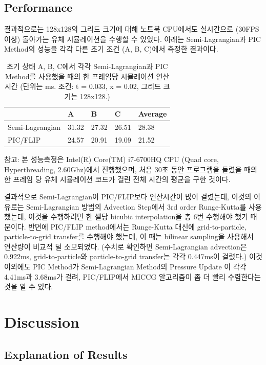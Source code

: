 \documentclass[10pt, A4]{article}
\begin{document}
\subsection{Performance}

결과적으로는 128x128의 그리드 크기에 대해 노트북 CPU에서도 실시간으로 (30FPS 이상) 돌아가는 유체 시뮬레이션을 수행할 수 있었다. 아래는 Semi-Lagrangian과 PIC Method의 성능을 각각 다른 초기 조건 (A, B, C)에서 측정한 결과이다. 

\begin{table}[h]
\centering
\begin{tabular}{|l|l|l|l|l|}
\hline
                & A     & B     & C     & Average \\ \hline
Semi-Lagrangian & 31.32 & 27.32 & 26.51 & 28.38   \\ \hline
PIC/FLIP        & 24.57 & 20.91 & 19.09 & 21.52   \\ \hline
\end{tabular}
  \caption{초기 상태 A, B, C에서 각각 Semi-Lagrangian과 PIC Method를 사용했을 때의 한 프레임당 시뮬레이션 연산 시간 (단위는 ms. 조건: \Delta t = 0.033, \Delta x = 0.02, 그리드 크기는 128x128.)}
\end{table}

참고: 본 성능측정은 Intel(R) Core(TM) i7-6700HQ CPU (Quad core, Hyperthreading, 2.60Ghz)에서 진행했으며, 처음 30초 동안 프로그램을 돌렸을 때의 한 프레임 당 유체 시뮬레이션 코드가 걸린 전체 시간의 평균을 구한 것이다.

결과적으로 Semi-Lagrangian이 PIC/FLIP보다 연산시간이 많이 걸렸는데, 이것의 이유로는 Semi-Lagrangian 방법의 Advection Step에서 3rd order Runge-Kutta를 사용했는데, 이것을 수행하려면 한 셀당 bicubic interpolation을 총 6번 수행해야 했기 때문이다. 반면에 PIC/FLIP method에서는 Runge-Kutta 대신에 grid-to-particle, particle-to-grid transfer를 수행해야 했는데, 이 때는 bilinear sampling을 사용해서 연산량이 비교적 덜 소모되었다. (수치로 확인하면 Semi-Lagrangian advection은 0.922ms, grid-to-particle와 particle-to-grid transfer는 각각 0.447ms이 걸렸다.) 이것 이외에도 PIC Method가 Semi-Lagrangian Method의 Pressure Update 이 각각 4.41ms과 3.68ms가 걸려, PIC/FLIP에서 MICCG 알고리즘이 좀 더 빨리 수렴한다는 것을 알 수 있다.

\section{Discussion}

\subsection{Explanation of Results}
\end{document}

